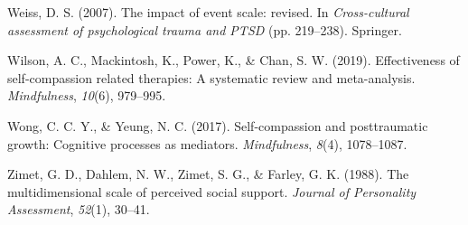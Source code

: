 \documentclass[
  man]{apa7}
\newlength{\cslhangindent}
\newlength{\cslentryspacingunit} %
\newenvironment{CSLReferences}[2] %
 {%
  \setlength{\parindent}{0pt}
  \ifodd #1
  \let\oldpar\par
  \def\par{\hangindent=\cslhangindent\oldpar}
  \fi
  \setlength{\parskip}{#2\cslentryspacingunit}
 }%
 {}
\begin{document}
\begin{CSLReferences}{1}{0}
\leavevmode{}%
Weiss, D. S. (2007). The impact of event scale: revised. In \emph{Cross-cultural assessment of psychological trauma and PTSD} (pp. 219--238). Springer.

\leavevmode{}%
Wilson, A. C., Mackintosh, K., Power, K., \& Chan, S. W. (2019). Effectiveness of self-compassion related therapies: A systematic review and meta-analysis. \emph{Mindfulness}, \emph{10}(6), 979--995.

\leavevmode{}%
Wong, C. C. Y., \& Yeung, N. C. (2017). Self-compassion and posttraumatic growth: Cognitive processes as mediators. \emph{Mindfulness}, \emph{8}(4), 1078--1087.

\leavevmode{}%
Zimet, G. D., Dahlem, N. W., Zimet, S. G., \& Farley, G. K. (1988). The multidimensional scale of perceived social support. \emph{Journal of Personality Assessment}, \emph{52}(1), 30--41.

\end{CSLReferences}
\end{document}
